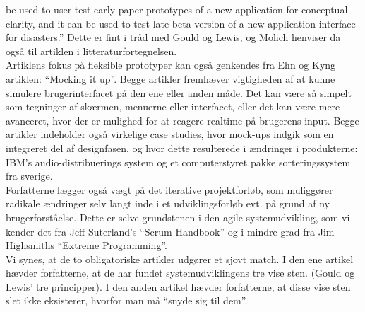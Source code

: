 \documentclass[12pt]{article}   %
\begin{document}
be used to user test early paper prototypes of a new application for
conceptual clarity, and it can be used to test late beta version of a new
application interface for disasters.'' Dette er fint i tråd med Gould og
Lewis, og Molich henviser da også til artiklen i litteraturfortegnelsen. \\
Artiklens fokus på fleksible prototyper kan også genkendes fra Ehn og Kyng
artiklen: ``Mocking it up''. Begge artikler fremhæver vigtigheden af at kunne
simulere brugerinterfacet på den ene eller anden måde. Det kan være så
simpelt som tegninger af skærmen, menuerne eller interfacet, eller det kan
være mere avanceret, hvor der er mulighed for at reagere realtime på brugerens
input. Begge artikler indeholder også virkelige case studies, hvor mock-ups
indgik som en integreret del af designfasen, og hvor dette resulterede i
ændringer i produkterne: IBM's audio-distribuerings system og et computerstyret
pakke sorteringssystem fra sverige.\\
Forfatterne lægger også vægt på det iterative projektforløb, som muliggører
radikale ændringer selv langt inde i et udviklingsforløb evt. på grund af ny
brugerforståelse. Dette er selve grundstenen i den agile systemudvikling, som
vi kender det fra Jeff Suterland's ``Scrum Handbook'' og i mindre grad  fra
Jim Highsmiths ``Extreme Programming''. \\
Vi synes, at de to obligatoriske artikler udgører et sjovt match. I den ene 
artikel hævder forfatterne, at de har fundet systemudviklingens tre vise sten.
(Gould og Lewis' tre principper). I den anden artikel hævder forfatterne, at disse
vise sten slet ikke eksisterer, hvorfor man må ``snyde sig til dem''.  
\end{document}
